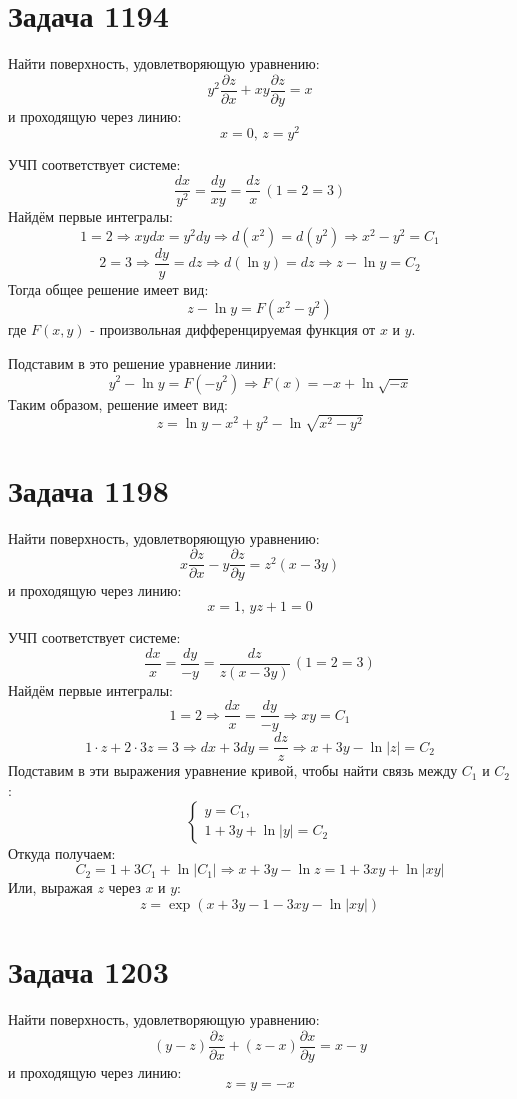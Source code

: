 \documentclass[11pt]{article}
\author{Sergey Makarov}
\date{\today}
\title{}
\begin{document}
\section{Задача 1194}
\label{sec:org21b22a9}
Найти поверхность, удовлетворяющую уравнению:
$$y^2\frac{\partial{z}}{\partial{x}} + xy\frac{\partial{z}}{\partial{y}} = x$$
и проходящую через линию:
$$x = 0,\, z = y^2$$

УЧП соответствует системе:
$$\frac{dx}{y^2} = \frac{dy}{xy} = \frac{dz}{x}\, (1 = 2 = 3)$$
Найдём первые интегралы:
$$1 = 2 \Rightarrow xydx = y^2dy \Rightarrow d(x^2) = d(y^2) \Rightarrow x^2 - y^2 = C_1$$
$$2 = 3 \Rightarrow \frac{dy}{y} = dz \Rightarrow d(\ln{y}) = dz \Rightarrow z - \ln{y} = C_2$$
Тогда общее решение имеет вид:
$$z - \ln{y} = F(x^2 - y^2)$$
где \(F(x, y)\) - произвольная дифференцируемая функция от \(x\) и \(y\).

Подставим в это решение уравнение линии:
$$y^2 - \ln{y} = F(-y^2) \Rightarrow F(x) = -x + \ln{\sqrt{-x}}$$
Таким образом, решение имеет вид:
$$z = \ln{y} - x^2 + y^2 - \ln{\sqrt{x^2 - y^2}}$$

\section{Задача 1198}
\label{sec:org9d5b853}
Найти поверхность, удовлетворяющую уравнению:
$$x\frac{\partial{z}}{\partial{x}} - y\frac{\partial{z}}{\partial{y}} = z^2(x - 3y)$$
и проходящую через линию:
$$x = 1,\, yz + 1 = 0$$

УЧП соответствует системе:
$$\frac{dx}{x} = \frac{dy}{-y} = \frac{dz}{z(x - 3y)}\, (1 = 2 = 3)$$
Найдём первые интегралы:
$$1 = 2 \Rightarrow \frac{dx}{x} = \frac{dy}{-y} \Rightarrow xy = C_1$$
$$1 \cdot z + 2 \cdot 3z = 3 \Rightarrow dx + 3dy = \frac{dz}{z} \Rightarrow x + 3y - \ln{|z|} = C_2$$
Подставим в эти выражения уравнение кривой, чтобы найти связь между \(C_1\) и \(C_2\):
\begin{equation*}
  \begin{cases}
    y = C_1,\\
    1 + 3y + \ln{|y|} = C_2
  \end{cases}
\end{equation*}
Откуда получаем:
$$C_2 = 1 + 3C_1 + \ln{|C_1|} \Rightarrow x + 3y - \ln{z} = 1 + 3xy + \ln{|xy|}$$
Или, выражая \(z\) через \(x\) и \(y\):
$$z = \exp{(x + 3y - 1 - 3xy - \ln{|xy|})}$$

\section{Задача 1203}
\label{sec:org48b4a3a}
Найти поверхность, удовлетворяющую уравнению:
$$(y - z)\frac{\partial{z}}{\partial{x}} + (z - x)\frac{\partial{x}}{\partial{y}} = x - y$$
и проходящую через линию:
$$z = y = -x$$
\end{document}
